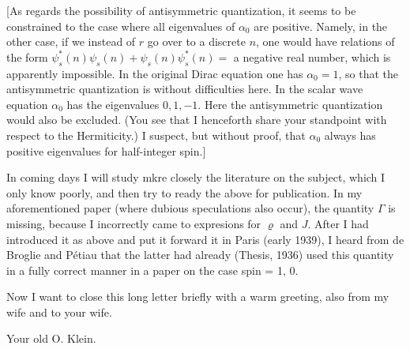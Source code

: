 [As regards the possibility of antisymmetric quantization, it seems to be constrained to the case where all eigenvalues of $\alpha_0$ are positive. Namely, in the other case, if we instead of $r$ go over to a discrete  $n$, one would have relations of the form $\psi_s^*(n)\psi_s(n) + \psi_s(n)\psi_s^*(n) = $ a negative real number, which is apparently impossible. In the original Dirac equation one has $\alpha_0=1$, so that the antisymmetric quantization is without difficulties here. In the scalar wave equation $\alpha_0$ has the eigenvalues $0,1,-1$. Here the antisymmetric quantization would also be excluded. (You see that I henceforth share your standpoint with respect to the Hermiticity.) I suspect, but without proof, that $\alpha_0$ always has positive eigenvalues for half-integer spin.]

In coming days I will study mkre closely the literature on the subject, which I only know poorly, and then try to ready the above for publication. In my aforementioned paper (where dubious speculations also occur), the quantity $\Gamma$ is missing, because I incorrectly came to  expresions for $\varrho$ and $J$. After I had introduced it as above and put it forward it in Paris (early 1939), I heard from de Broglie and P\'etiau that the latter had already (Thesis, 1936) used this quantity in a fully correct manner in a paper on the case spin = 1, 0.

Now I want to close this long letter briefly with a warm greeting, also from my wife and to your wife.

Your old O. Klein.

